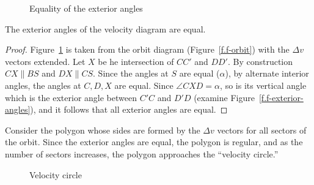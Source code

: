 \begin{figure}[b]
\begin{minipage}{.48\textwidth}
\begin{center}
\caption{Equality of the exterior angles}\label{f.f-circle}
\end{center}
\end{minipage}
\end{figure}


\begin{theorem}
The exterior angles of the velocity diagram are equal.
\end{theorem}
\begin{proof}
Figure~\ref{f.f-circle} is taken from the orbit diagram (Figure~\ref{f.f-orbit}) with the $\Delta v$ vectors extended. Let $X$ be he intersection of $CC'$ and $DD'$. By construction $CX\parallel BS$ and $DX\parallel CS$. Since the angles at $S$ are equal ($\alpha$), by alternate interior angles, the angles at $C,D,X$  are equal. Since $\angle CXD=\alpha$, so is its vertical angle which is the exterior angle between $C'C$ and $D'D$ (examine Figure~\ref{f.f-exterior-angles}), and it follows that all exterior angles are equal.\fqed
\end{proof}

Consider the polygon whose sides are formed by the $\Delta v$ vectors for all sectors of the orbit. Since the exterior angles are equal, the polygon is regular, and as the number of sectors increases, the polygon approaches  the ``velocity circle.''


\begin{figure}
\begin{center}
\caption{Velocity circle}\label{f.f-velocity-circle}
\end{center}
\end{figure}

